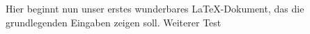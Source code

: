 \documentclass[10pt, a4paper]{article}
\begin{document}
 Hier beginnt nun unser erstes wunderbares LaTeX-Dokument,
 das die grundlegenden Eingaben zeigen soll. Weiterer Test
 
\end{document}

